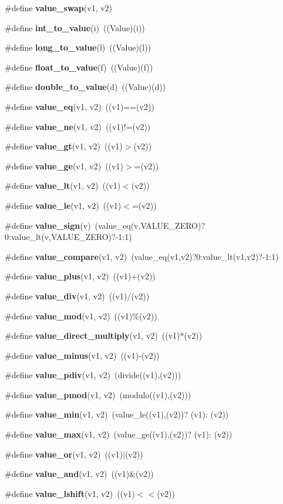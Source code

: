 \begin{CompactItemize}
\item 
\#define {\bf value\_\-swap}(v1, v2)
\item 
\#define {\bf int\_\-to\_\-value}(i)\ ((Value)(i))
\item 
\#define {\bf long\_\-to\_\-value}(l)\ ((Value)(l))
\item 
\#define {\bf float\_\-to\_\-value}(f)\ ((Value)(f))
\item 
\#define {\bf double\_\-to\_\-value}(d)\ ((Value)(d))
\item 
\#define {\bf value\_\-eq}(v1, v2)\ ((v1)==(v2))
\item 
\#define {\bf value\_\-ne}(v1, v2)\ ((v1)!=(v2))
\item 
\#define {\bf value\_\-gt}(v1, v2)\ ((v1)$>$(v2))
\item 
\#define {\bf value\_\-ge}(v1, v2)\ ((v1)$>$=(v2))
\item 
\#define {\bf value\_\-lt}(v1, v2)\ ((v1)$<$(v2))
\item 
\#define {\bf value\_\-le}(v1, v2)\ ((v1)$<$=(v2))
\item 
\#define {\bf value\_\-sign}(v)\ (value\_\-eq(v,VALUE\_\-ZERO)?0:value\_\-lt(v,VALUE\_\-ZERO)?-1:1)
\item 
\#define {\bf value\_\-compare}(v1, v2)\ (value\_\-eq(v1,v2)?0:value\_\-lt(v1,v2)?-1:1)
\item 
\#define {\bf value\_\-plus}(v1, v2)\ ((v1)+(v2))
\item 
\#define {\bf value\_\-div}(v1, v2)\ ((v1)/(v2))
\item 
\#define {\bf value\_\-mod}(v1, v2)\ ((v1)\%(v2))
\item 
\#define {\bf value\_\-direct\_\-multiply}(v1, v2)\ ((v1)$\ast$(v2))
\item 
\#define {\bf value\_\-minus}(v1, v2)\ ((v1)-(v2))
\item 
\#define {\bf value\_\-pdiv}(v1, v2)\ (divide((v1),(v2)))
\item 
\#define {\bf value\_\-pmod}(v1, v2)\ (modulo((v1),(v2)))
\item 
\#define {\bf value\_\-min}(v1, v2)\ (value\_\-le((v1),(v2))? (v1): (v2))
\item 
\#define {\bf value\_\-max}(v1, v2)\ (value\_\-ge((v1),(v2))? (v1): (v2))
\item 
\#define {\bf value\_\-or}(v1, v2)\ ((v1)$|$(v2))
\item 
\#define {\bf value\_\-and}(v1, v2)\ ((v1)\&(v2))
\item 
\#define {\bf value\_\-lshift}(v1, v2)\ ((v1)$<$$<$(v2))
$$
\end{CompactItemize}
